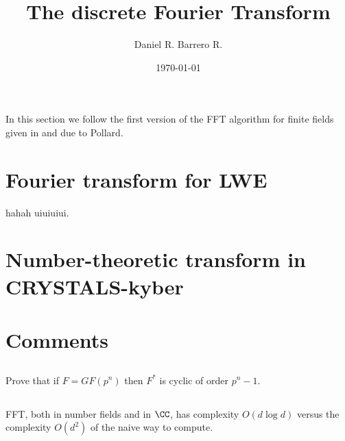 \documentclass{amsart}
\title{The discrete Fourier Transform}
\author{Daniel R. Barrero R.}
\date{\today}
\begin{document}
\maketitle

\section{}

In this section we follow the first version of the FFT algorithm for finite
fields given in \cite{pollard-fftFiniteFields-1971} and due to Pollard.

%

\section{Fourier transform for LWE}

hahah \cite{regev-LWE-2009} uiuiuiui.

\section{Number-theoretic transform in CRYSTALS-kyber}

\section{Comments}

\subsection{} Prove that if $F = GF(p^n)$ then $F^*$ is cyclic of order
$p^n - 1$.

\subsection{} FFT, both in number fields and in $\CC$, has complexity
$O(d \log d)$ versus the complexity $O(d^2)$ of the naive way to compute.



%
\end{document}

